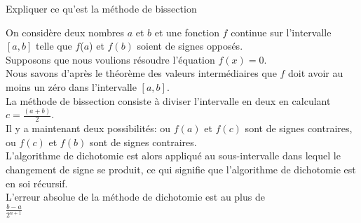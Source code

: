 \documentclass[12pt]{article}
\newcommand*{\xfield}[1]{\begin{mdframed}\centering #1\end{mdframed}\bigskip}
\newenvironment{note}{}{}
\begin{document}
\begin{note}
	\xfield{Expliquer ce qu'est la méthode de bissection}
	\xfield{On considère deux nombres $a$ et $b$ et une fonction $f$ continue sur l'intervalle $[a, b]$ telle que $f$($a$) et $f(b)$ soient de signes opposés.\\
Supposons que nous voulions résoudre l’équation $f(x) = 0$.\\
Nous savons d'après le théorème des valeurs intermédiaires que $f$ doit avoir au moins un zéro dans l’intervalle $[a, b]$.\\
La méthode de bissection consiste à diviser l’intervalle en deux en calculant $c = \frac{(a+b)}{2}$.\\
Il y a maintenant deux possibilités: ou $f(a)$ et $f(c)$ sont de signes contraires, ou $f(c)$ et $f(b)$ sont de signes contraires.\\
L’algorithme de dichotomie est alors appliqué au sous-intervalle dans lequel le changement de signe se produit, ce qui signifie que l’algorithme de dichotomie est en soi récursif.\\
L’erreur absolue de la méthode de dichotomie est au plus de \\
$\frac{b-a}{2^{n+1}}$}
\end{note}
\end{document}
